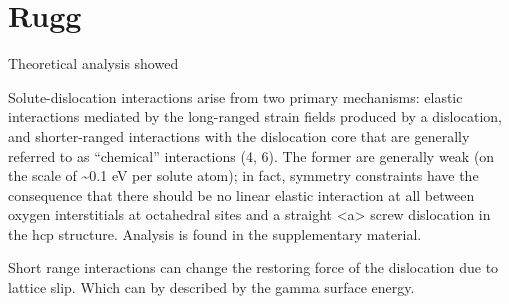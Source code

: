 \documentclass[a4paper,12pt,oneside,print,numbered,index,PageStyleIII]{PhDThesisPSnPDF}
\begin{document}
\section{Rugg}
\label{sec:orgca50ffb}
Theoretical analysis showed 

Solute-dislocation interactions arise from two primary mechanisms:
elastic interactions mediated by the long-ranged strain fields
produced by a dislocation, and shorter-ranged interactions with the
dislocation core that are generally referred to as “chemical”
interactions (4, 6). The former are generally weak (on the scale of
\textasciitilde{}0.1 eV per solute atom); in fact, symmetry constraints have the
consequence that there should be no linear elastic interaction at
all between oxygen interstitials at octahedral sites and a straight
<a> screw dislocation in the hcp structure. Analysis is found in
the supplementary material. 


Short range interactions can change the restoring force of the
dislocation due to lattice slip. Which can by described by the
gamma surface energy. 
\end{document}
